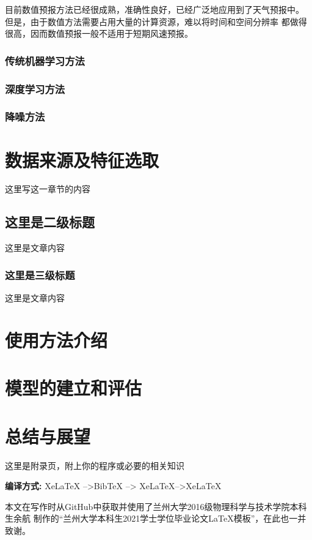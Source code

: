 \documentclass[AutoFakeBold]{LZUThesis}
\begin{document}
目前数值预报方法已经很成熟，准确性良好，已经广泛地应用到了天气预报中。
但是，由于数值方法需要占用大量的计算资源，难以将时间和空间分辨率
都做得很高，因而数值预报一般不适用于短期风速预报。

\subsection{传统机器学习方法}

\subsection{深度学习方法}

\subsection{降噪方法}



\chapter{数据来源及特征选取}

这里写这一章节的内容

\section{这里是二级标题}
这里是文章内容

\subsection{这里是三级标题}
这里是文章内容

\chapter{使用方法介绍}

\chapter{模型的建立和评估}

\chapter{总结与展望}

\backmatter


\printbib


\Appendix


这里是附录页，附上你的程序或必要的相关知识

{\bfseries 编译方式:} XeLaTeX -->BibTeX --> XeLaTeX-->XeLaTeX



\Thanks

本文在写作时从GitHub中获取并使用了兰州大学2016级物理科学与技术学院本科生余航
制作的“兰州大学本科生2021学士学位毕业论文LaTeX模板”，在此也一并致谢。
\end{document}

